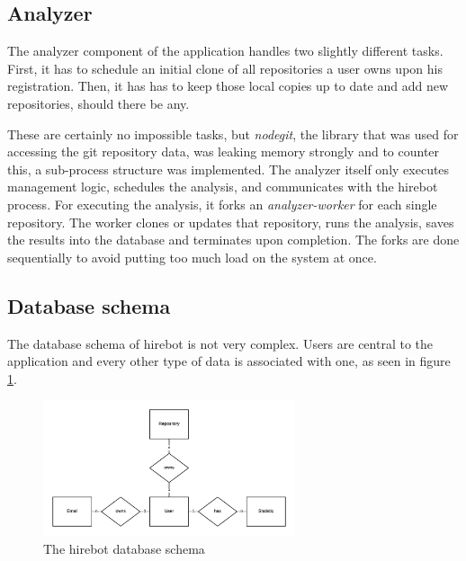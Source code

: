 \subsection{Analyzer}
The analyzer component of the application handles two slightly different
tasks. First, it has to schedule an initial clone of all repositories
a user owns upon his registration. Then, it has has to keep those local
copies up to date and add new repositories, should there be any.
\newline

These are certainly no impossible tasks, but \textit{nodegit}, the library
that was used for accessing the git repository data, was
leaking memory strongly and to counter this, a sub-process structure was
implemented. The analyzer itself only executes management logic,
schedules the analysis, and communicates with the hirebot process.
For executing the analysis, it forks an \textit{analyzer-worker} for each
single repository. The worker clones or updates that repository,
runs the analysis, saves the results into the database and terminates
upon completion. The forks are done sequentially to avoid putting
too much load on the system at once.

\subsection{Database schema}
The database schema of hirebot is not very complex.
Users are central to the application and every other type of data
is associated with one, as seen in figure \ref{fig:schema}.

\begin{figure}
  \centering
  \includegraphics[width=20em]{gfx/schema.png}
  \caption{The hirebot database schema}
  \label{fig:schema}
\end{figure}